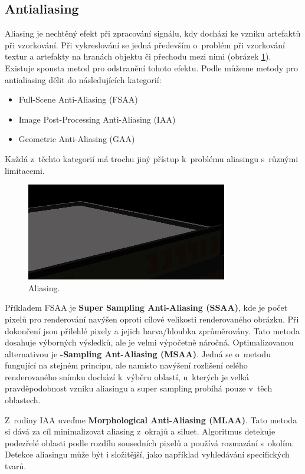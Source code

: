 \subsection{Antialiasing}
Aliasing je nechtěný efekt při zpracování signálu, kdy dochází ke vzniku artefaktů při vzorkování. Při vykreslování se jedná především o~problém při vzorkování textur a artefakty na hranách objektu či přechodu mezi nimi (obrázek \ref{fig:aliasing}). Existuje spousta metod pro odstranění tohoto efektu. Podle \cite{aa_survey} můžeme metody pro antialiasing dělit do následujících kategorií:

\begin{itemize}
	\item Full-Scene Anti-Aliasing (FSAA)
	\item Image Post-Processing Anti-Aliasing (IAA)
	\item Geometric Anti-Aliasing (GAA)
\end{itemize}

Každá z~těchto kategorií má trochu jiný přístup k~problému aliasingu s~různými limitacemi.

\begin{figure}[H]
	\centering
	\includegraphics[scale=2]{obrazky-figures/aliasing.png}
	\caption{Aliasing. }
	\label{fig:aliasing}
\end{figure}

Příkladem FSAA je \textbf{Super Sampling Anti-Aliasing (SSAA)}, kde je počet pixelů pro renderování navýšen oproti cílové velikosti renderovaného obrázku. Při dokončení jsou přilehlé pixely a jejich barva/hloubka zprůměrovány. Tato metoda dosahuje výborných výsledků, ale je velmi výpočetně náročná. Optimalizovanou alternativou je \textbf{-Sampling Ant-Aliasing (MSAA)}. Jedná se o~metodu fungující na stejném principu, ale namísto navýšení rozlišení celého renderovaného snímku dochází k~výběru oblastí, u~kterých je velká pravděpodobnost vzniku aliasingu a super sampling probíhá pouze v~těch oblastech.

Z~rodiny IAA uveďme\textbf{ Morphological Anti-Aliasing (MLAA)}. Tato metoda si dává za cíl minimalizovat aliasing z~okrajů a siluet. Algoritmus detekuje podezřelé oblasti podle rozdílu sousedních pixelů a používá rozmazání s~okolím. Detekce aliasingu může být i složitější, jako například vyhledávání specifických tvarů.


